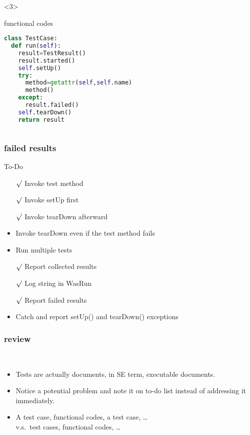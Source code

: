\documentclass[lualatex]{beamer}
\begin{document}
\begin{frame}[fragile,t]
\begin{columns}[t]
        \begin{onlyenv}<3>
            \begin{block}{functional codes}
                \begin{lstlisting}[language=Python,columns=fullflexible]
class TestCase:
  def run(self):
    result=TestResult()
    result.started()
    self.setUp()
    try:
      method=getattr(self,self.name)
      method()
    except:
      result.failed()
    self.tearDown()
    return result
                \end{lstlisting}
            \end{block}
        \end{onlyenv}
    \end{columns}
\end{frame}

\begin{frame}
    \frametitle{failed results}

    \begin{block}{To-Do}
        \begin{itemize}
            \item[$\surd$] Invoke test method
            \item[$\surd$] Invoke setUp first 
            \item[$\surd$] Invoke tearDown afterward 
            \item Invoke tearDown even if the test method fails 
            \item Run multiple tests 
            \item[$\surd$] Report collected results 
            \item[$\surd$] Log string in WasRun 
            \item[$\surd$] Report failed results
            \item Catch and report setUp() and tearDown() exceptions
        \end{itemize}
    \end{block}
\end{frame}

\begin{frame}
    \frametitle{review}

    \begin{block}{~}
        \begin{itemize}
            \item 
                Tests are actually documents, in SE term, executable documents.
            \item 
                Notice a potential problem and note it on to-do list instead of addressing it immediately.
            \item 
                A test case, functional codes, a test case, \ldots\\
                v.s.\ test cases, functional codes, \ldots
        \end{itemize}
    \end{block}
\end{frame}
\end{document}
